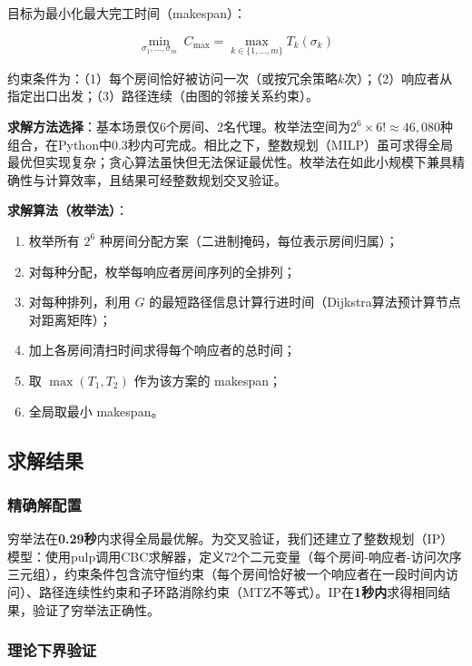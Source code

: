 \documentclass[12pt,a4paper]{ctexart}
\begin{document}
目标为最小化最大完工时间（makespan）：

\begin{equation}\label{eq:makespan}
\min_{\sigma_1,\ldots,\sigma_m} \; C_{\max} = \max_{k\in\{1,\ldots,m\}} T_k(\sigma_k)
\end{equation}

约束条件为：（1）每个房间恰好被访问一次（或按冗余策略$k$次）；（2）响应者从指定出口出发；（3）路径连续（由图的邻接关系约束）。

\textbf{求解方法选择}：基本场景仅6个房间、2名代理。枚举法空间为$2^6 \times 6! \approx 46,080$种组合，在Python中0.3秒内可完成。相比之下，整数规划（MILP）虽可求得全局最优但实现复杂；贪心算法虽快但无法保证最优性。枚举法在如此小规模下兼具精确性与计算效率，且结果可经整数规划交叉验证。

\textbf{求解算法（枚举法）}：
\begin{enumerate}[nosep]
    \item 枚举所有 $2^6$ 种房间分配方案（二进制掩码，每位表示房间归属）；
    \item 对每种分配，枚举每响应者房间序列的全排列；
    \item 对每种排列，利用 $G$ 的最短路径信息计算行进时间（Dijkstra算法预计算节点对距离矩阵）；
    \item 加上各房间清扫时间求得每个响应者的总时间；
    \item 取 $\max(T_1, T_2)$ 作为该方案的 makespan；
    \item 全局取最小 makespan。
\end{enumerate}

\subsection{求解结果}

\subsubsection{精确解配置}

穷举法在\textbf{0.29秒}内求得全局最优解。为交叉验证，我们还建立了整数规划（IP）模型：使用pulp调用CBC求解器，定义72个二元变量（每个房间-响应者-访问次序三元组），约束条件包含流守恒约束（每个房间恰好被一个响应者在一段时间内访问）、路径连续性约束和子环路消除约束（MTZ不等式）。IP在\textbf{1秒内}求得相同结果，验证了穷举法正确性。

\subsubsection{理论下界验证}
\end{document}
